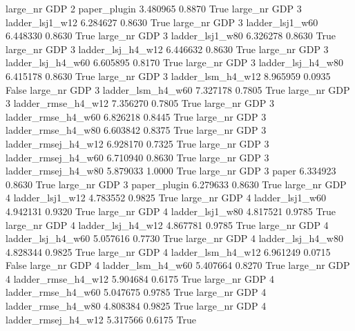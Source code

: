   large_nr      GDP                 2        paper_plugin    3.480965      0.8870    True
  large_nr      GDP                 3     ladder_lsj1_w12    6.284627      0.8630    True
  large_nr      GDP                 3     ladder_lsj1_w60    6.448330      0.8630    True
  large_nr      GDP                 3     ladder_lsj1_w80    6.326278      0.8630    True
  large_nr      GDP                 3   ladder_lsj_h4_w12    6.446632      0.8630    True
  large_nr      GDP                 3   ladder_lsj_h4_w60    6.605895      0.8170    True
  large_nr      GDP                 3   ladder_lsj_h4_w80    6.415178      0.8630    True
  large_nr      GDP                 3   ladder_lsm_h4_w12    8.965959      0.0935   False
  large_nr      GDP                 3   ladder_lsm_h4_w60    7.327178      0.7805    True
  large_nr      GDP                 3  ladder_rmse_h4_w12    7.356270      0.7805    True
  large_nr      GDP                 3  ladder_rmse_h4_w60    6.826218      0.8445    True
  large_nr      GDP                 3  ladder_rmse_h4_w80    6.603842      0.8375    True
  large_nr      GDP                 3 ladder_rmsej_h4_w12    6.928170      0.7325    True
  large_nr      GDP                 3 ladder_rmsej_h4_w60    6.710940      0.8630    True
  large_nr      GDP                 3 ladder_rmsej_h4_w80    5.879033      1.0000    True
  large_nr      GDP                 3               paper    6.334923      0.8630    True
  large_nr      GDP                 3        paper_plugin    6.279633      0.8630    True
  large_nr      GDP                 4     ladder_lsj1_w12    4.783552      0.9825    True
  large_nr      GDP                 4     ladder_lsj1_w60    4.942131      0.9320    True
  large_nr      GDP                 4     ladder_lsj1_w80    4.817521      0.9785    True
  large_nr      GDP                 4   ladder_lsj_h4_w12    4.867781      0.9785    True
  large_nr      GDP                 4   ladder_lsj_h4_w60    5.057616      0.7730    True
  large_nr      GDP                 4   ladder_lsj_h4_w80    4.828344      0.9825    True
  large_nr      GDP                 4   ladder_lsm_h4_w12    6.961249      0.0715   False
  large_nr      GDP                 4   ladder_lsm_h4_w60    5.407664      0.8270    True
  large_nr      GDP                 4  ladder_rmse_h4_w12    5.904684      0.6175    True
  large_nr      GDP                 4  ladder_rmse_h4_w60    5.047675      0.9785    True
  large_nr      GDP                 4  ladder_rmse_h4_w80    4.808384      0.9825    True
  large_nr      GDP                 4 ladder_rmsej_h4_w12    5.317566      0.6175    True
